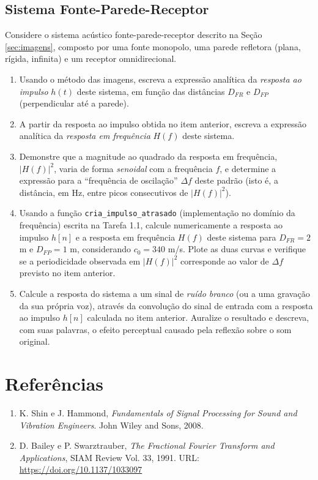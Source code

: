 \documentclass[a4paper,twoside,12pt]{article}
\begin{document}
	\subsection{Sistema Fonte-Parede-Receptor}
	\label{sec:tarefas2}
	
	Considere o sistema acústico fonte-parede-receptor descrito na Seção \ref{sec:imagens}, composto por uma fonte monopolo, uma parede refletora (plana, rígida, infinita) e um receptor omnidirecional.
	
	\begin{enumerate}
		\item Usando o método das imagens, escreva a expressão analítica da \emph{resposta ao impulso} $h(t)$ deste sistema, em função das distâncias $D_{FR}$ e $D_{FP}$ (perpendicular até a parede).
		
		\item A partir da resposta ao impulso obtida no item anterior, escreva a expressão analítica da \emph{resposta em frequência} $H(f)$ deste sistema.
		
		\item Demonstre que a magnitude ao quadrado da resposta em frequência, $|H(f)|^2$, varia de forma \emph{senoidal} com a frequência $f$, e determine a expressão para a ``frequência de oscilação'' $\Delta f$ deste padrão (isto é, a distância, em Hz, entre picos consecutivos de $|H(f)|^2$).
		
		\item Usando a função \texttt{cria\_impulso\_atrasado} (implementação no domínio da frequência) escrita na Tarefa 1.1, calcule numericamente a resposta ao impulso $h[n]$ e a resposta em frequência $H(f)$ deste sistema para $D_{FR} = 2$ m e $D_{FP} = 1$ m, considerando $c_0 = 340$ m/s. Plote as duas curvas e verifique se a periodicidade observada em $|H(f)|^2$ corresponde ao valor de $\Delta f$ previsto no item anterior.
		
		\item Calcule a resposta do sistema a um sinal de \emph{ruído branco} (ou a uma gravação da sua própria voz), através da convolução do sinal de entrada com a resposta ao impulso $h[n]$ calculada no item anterior. Auralize o resultado e descreva, com suas palavras, o efeito perceptual causado pela reflexão sobre o som original.
	\end{enumerate}
	
	\section*{Referências}
	
	\begin{enumerate}
		\item K. Shin e J. Hammond, \textit{Fundamentals of Signal Processing for Sound and Vibration Engineers}. John Wiley and Sons, 2008.
		\item D. Bailey e P. Swarztrauber, \textit{The Fractional Fourier Transform and Applications}, SIAM Review
		Vol. 33, 1991. URL: \url{https://doi.org/10.1137/1033097}
	\end{enumerate}
	
\end{document}
